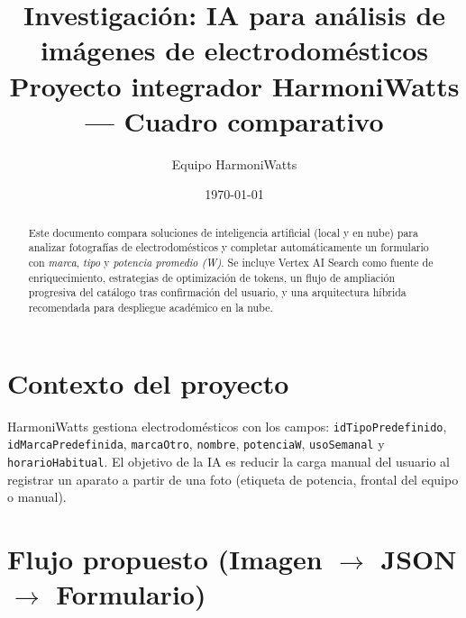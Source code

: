 \documentclass[11pt,a4paper]{article}
\title{\textbf{Investigación: IA para análisis de imágenes de electrodomésticos}\\
\large Proyecto integrador HarmoniWatts --- Cuadro comparativo}
\author{Equipo HarmoniWatts}
\date{\today}
\begin{document}
\maketitle

\begin{abstract}
Este documento compara soluciones de inteligencia artificial (local y en nube) para analizar fotografías de electrodomésticos y completar automáticamente un formulario con \emph{marca}, \emph{tipo} y \emph{potencia promedio (W)}. Se incluye Vertex AI Search como fuente de enriquecimiento, estrategias de optimización de tokens, un flujo de ampliación progresiva del catálogo tras confirmación del usuario, y una arquitectura híbrida recomendada para despliegue académico en la nube.
\end{abstract}

\section{Contexto del proyecto}

HarmoniWatts gestiona electrodomésticos con los campos: \texttt{idTipoPredefinido}, \texttt{idMarcaPredefinida}, \texttt{marcaOtro}, \texttt{nombre}, \texttt{potenciaW}, \texttt{usoSemanal} y \texttt{horarioHabitual}. El objetivo de la IA es reducir la carga manual del usuario al registrar un aparato a partir de una foto (etiqueta de potencia, frontal del equipo o manual).

\section{Flujo propuesto (Imagen $\rightarrow$ JSON $\rightarrow$ Formulario)}
\end{document}
